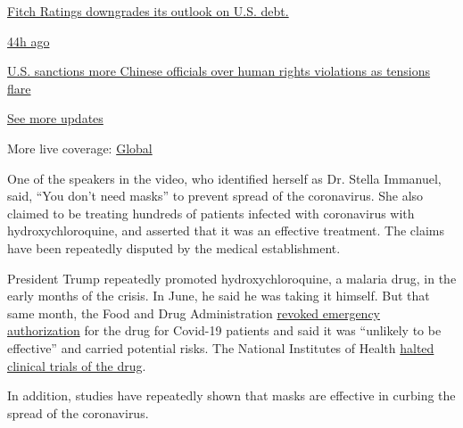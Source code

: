 \href{https://www.nytimes.com/live/2020/07/31/business/stock-market-today-coronavirus?action=click\&pgtype=Article\&state=default\&region=MAIN_CONTENT_1\&context=storylines_live_updates\#fitch-ratings-downgrades-its-outlook-on-us-debt}{Fitch
Ratings downgrades its outlook on U.S. debt.}

\href{https://www.nytimes.com/live/2020/07/31/business/stock-market-today-coronavirus?action=click\&pgtype=Article\&state=default\&region=MAIN_CONTENT_1\&context=storylines_live_updates\#us-sanctions-more-chinese-officials-over-human-rights-violations-as-tensions-flare}{44h
ago}

\href{https://www.nytimes.com/live/2020/07/31/business/stock-market-today-coronavirus?action=click\&pgtype=Article\&state=default\&region=MAIN_CONTENT_1\&context=storylines_live_updates\#us-sanctions-more-chinese-officials-over-human-rights-violations-as-tensions-flare}{U.S.
sanctions more Chinese officials over human rights violations as
tensions flare}

\href{https://www.nytimes.com/live/2020/07/31/business/stock-market-today-coronavirus?action=click\&pgtype=Article\&state=default\&region=MAIN_CONTENT_1\&context=storylines_live_updates}{See
more updates}

More live coverage:
\href{https://www.nytimes.com/2020/08/01/world/coronavirus-covid-19.html?action=click\&pgtype=Article\&state=default\&region=MAIN_CONTENT_1\&context=storylines_live_updates}{Global}

One of the speakers in the video, who identified herself as Dr. Stella
Immanuel, said, ``You don't need masks'' to prevent spread of the
coronavirus. She also claimed to be treating hundreds of patients
infected with coronavirus with hydroxychloroquine, and asserted that it
was an effective treatment. The claims have been repeatedly disputed by
the medical establishment.

President Trump repeatedly promoted hydroxychloroquine, a malaria drug,
in the early months of the crisis. In June, he said he was taking it
himself. But that same month, the Food and Drug Administration
\href{https://www.fda.gov/media/138945/download}{revoked emergency
authorization} for the drug for Covid-19 patients and said it was
``unlikely to be effective'' and carried potential risks. The National
Institutes of Health
\href{https://www.nytimes.com/2020/06/20/health/hydroxychloroquine-coronavirus-trial.html}{halted
clinical trials of the drug}.

In addition, studies have repeatedly shown that masks are effective in
curbing the spread of the coronavirus.

